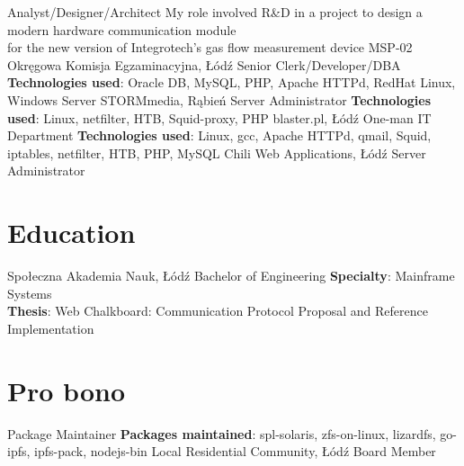 \documentclass[%
               doublesided,
               paper=a4,
               fontsize=10pt
              ]{my-resume}
\begin{document}
{        {Analyst/Designer/Architect}
        {My role involved R\&D in a project to design a modern hardware communication module\\
        for the new version of Integrotech's gas flow measurement device MSP-02}
        {Okręgowa Komisja Egzaminacyjna, Łódź}
        {Senior Clerk/Developer/DBA}
        {{\bfseries Technologies used}: Oracle DB, MySQL, PHP, Apache HTTPd, RedHat Linux, Windows Server}
        {STORMmedia, Rąbień}
        {Server Administrator}
        {{\bfseries Technologies used}: Linux, netfilter, HTB, Squid-proxy, PHP}
        {blaster.pl, Łódź}
        {One-man IT Department}
        {{\bfseries Technologies used}: Linux, gcc, Apache HTTPd, qmail, Squid, iptables, netfilter, HTB, PHP, MySQL}
        {Chili Web Applications, Łódź}
        {Server Administrator}
        {}
    
    \section[\faMortarBoard]{Education}
        {Społeczna Akademia Nauk, Łódź}
        {Bachelor of Engineering}
        {
            {\bfseries Specialty}: Mainframe Systems\\
            {\bfseries Thesis}: Web Chalkboard: Communication Protocol Proposal and Reference Implementation
        }

    \section[\faChild]{Pro bono}
        {Package Maintainer}
        {{\bfseries Packages maintained}: spl-solaris, zfs-on-linux, lizardfs, go-ipfs, ipfs-pack, nodejs-bin}
        {Local Residential Community, Łódź}
        {Board Member}
        {}

    
}
\end{document}
